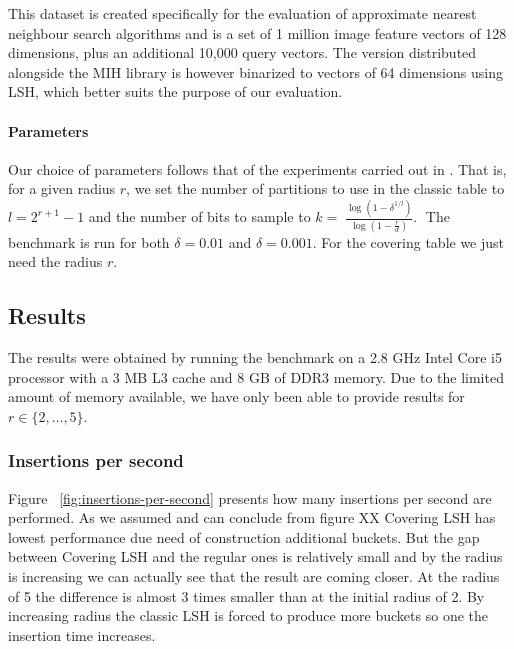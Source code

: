 This dataset is created specifically for the evaluation of approximate nearest neighbour search algorithms and is a set of 1 million image feature vectors of 128 dimensions, plus an additional 10,000 query vectors. The version distributed alongside the MIH library is however binarized to vectors of 64 dimensions using LSH, which better suits the purpose of our evaluation.

\paragraph{Parameters} Our choice of parameters follows that of the experiments carried out in \cite{DBLP:journals/corr/PhamP16}. That is, for a given radius $r$, we set the number of partitions to use in the classic table to $l = 2^{r + 1} - 1$ and the number of bits to sample to $k = 􏰢\frac{\log(1 - \delta^{1 / l})}{\log(1 - \frac{r}{d})}$.􏰣 The benchmark is run for both $\delta = 0.01$ and $\delta = 0.001$. For the covering table we just need the radius $r$.

\subsection{Results}

The results were obtained by running the benchmark on a 2.8 GHz Intel Core i5 processor with a 3 MB L3 cache and 8 GB of DDR3 memory. Due to the limited amount of memory available, we have only been able to provide results for $r \in \{2,\ldots,5\}$.

\subsubsection{Insertions per second}

Figure ~\ref{fig:insertions-per-second} presents how many insertions per second are performed. As we assumed and can conclude from figure XX  Covering LSH has lowest performance due need of construction additional buckets. But the gap between Covering LSH and the regular ones is relatively small and by the radius is increasing we can actually see that the result are coming closer. At the radius of 5 the difference is almost 3 times smaller than at the initial radius of 2. By increasing radius the classic LSH is forced to produce more buckets so one the insertion time increases.

